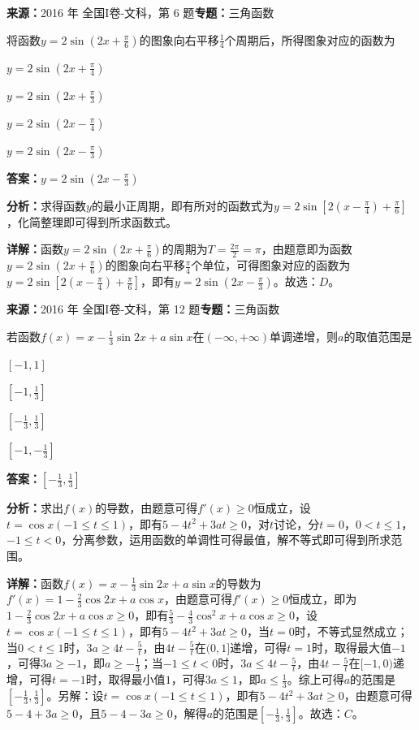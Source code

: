 \begin{question}[points=5]
\textbf{来源：}2016 年 全国I卷-文科，第 6 题\quad \textbf{专题：}三角函数\par
将函数$y=2\sin(2x+\frac{\pi}{6})$的图象向右平移$\frac{1}{4}$个周期后，所得图象对应的函数为
\begin{choices}
  \item $y=2\sin(2x+\frac{\pi}{4})$
  \item $y=2\sin(2x+\frac{\pi}{3})$
  \item $y=2\sin(2x-\frac{\pi}{4})$
  \item $y=2\sin(2x-\frac{\pi}{3})$
\end{choices}
\begin{solution}
\textbf{答案：}$y=2\sin(2x-\frac{\pi}{3})$

\textbf{分析：}求得函数$y$的最小正周期，即有所对的函数式为$y=2\sin[2(x-\frac{\pi}{4})+\frac{\pi}{6}]$，化简整理即可得到所求函数式。

\textbf{详解：}函数$y=2\sin(2x+\frac{\pi}{6})$的周期为$T=\frac{2\pi}{2}=\pi$，由题意即为函数$y=2\sin(2x+\frac{\pi}{6})$的图象向右平移$\frac{\pi}{4}$个单位，可得图象对应的函数为$y=2\sin[2(x-\frac{\pi}{4})+\frac{\pi}{6}]$，即有$y=2\sin(2x-\frac{\pi}{3})$。故选：$D$。
\end{solution}
\end{question}

\begin{question}[points=5]
\textbf{来源：}2016 年 全国I卷-文科，第 12 题\quad \textbf{专题：}三角函数\par
若函数$f(x)=x-\frac{1}{3}\sin2x+a\sin x$在$(-\infty,+\infty)$单调递增，则$a$的取值范围是
\begin{choices}
  \item $[-1,1]$
  \item $[-1,\frac{1}{3}]$
  \item $[-\frac{1}{3},\frac{1}{3}]$
  \item $[-1,-\frac{1}{3}]$
\end{choices}
\begin{solution}
\textbf{答案：}$[-\frac{1}{3},\frac{1}{3}]$

\textbf{分析：}求出$f(x)$的导数，由题意可得$f'(x)\ge0$恒成立，设$t=\cos x(-1\le t\le1)$，即有$5-4t^2+3at\ge0$，对$t$讨论，分$t=0$，$0<t\le1$，$-1\le t<0$，分离参数，运用函数的单调性可得最值，解不等式即可得到所求范围。

\textbf{详解：}函数$f(x)=x-\frac{1}{3}\sin2x+a\sin x$的导数为$f'(x)=1-\frac{2}{3}\cos2x+a\cos x$，由题意可得$f'(x)\ge0$恒成立，即为$1-\frac{2}{3}\cos2x+a\cos x\ge0$，即有$\frac{5}{3}-\frac{4}{3}\cos^2x+a\cos x\ge0$，设$t=\cos x(-1\le t\le1)$，即有$5-4t^2+3at\ge0$，当$t=0$时，不等式显然成立；当$0<t\le1$时，$3a\ge4t-\frac{5}{t}$，由$4t-\frac{5}{t}$在$(0,1]$递增，可得$t=1$时，取得最大值$-1$，可得$3a\ge-1$，即$a\ge-\frac{1}{3}$；当$-1\le t<0$时，$3a\le4t-\frac{5}{t}$，由$4t-\frac{5}{t}$在$[-1,0)$递增，可得$t=-1$时，取得最小值$1$，可得$3a\le1$，即$a\le\frac{1}{3}$。综上可得$a$的范围是$[-\frac{1}{3},\frac{1}{3}]$。另解：设$t=\cos x(-1\le t\le1)$，即有$5-4t^2+3at\ge0$，由题意可得$5-4+3a\ge0$，且$5-4-3a\ge0$，解得$a$的范围是$[-\frac{1}{3},\frac{1}{3}]$。故选：$C$。
\end{solution}
\end{question}

